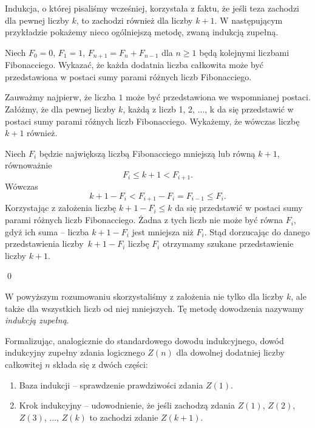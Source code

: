 


\noindent
Indukcja, o której pisaliśmy wcześniej, korzystała z faktu, że jeśli teza zachodzi dla pewnej liczby $k$, to zachodzi również dla liczby $k + 1$. W następującym przykładzie pokażemy nieco ogólniejszą metodę, zwaną indukcją zupełną.

\vspace{10px}


\noindent
Niech $F_0 = 0$, $F_1 = 1$, $F_{n + 1} = F_n + F_{n - 1}$ dla $n \geqslant 1$ będą kolejnymi liczbami Fibonacciego. Wykazać, że każda dodatnia liczba całkowita może być przedstawiona w postaci sumy parami różnych liczb Fibonacciego.

\vspace{10px}


\noindent
Zauważmy najpierw, że liczba $1$ może być przedstawiona we wspomnianej postaci.
Załóżmy, że dla pewnej liczby $k$, każdą z liczb 1, 2, ..., k da się przedstawić w postaci sumy parami różnych liczb Fibonacciego. Wykażemy, że wówczas liczbę $k + 1$ również.

\vspace{10px}

\noindent
Niech $F_i$ będzie największą liczbą Fibonacciego mniejszą lub równą $k + 1$, równoważnie
\[
	F_i \leqslant k + 1 < F_{i + 1}.
\]
Wówczas
\[
	k + 1 - F_i < F_{i + 1} -  F_{i} = F_{i - 1} \leqslant F_{i}.
\]
Korzystając z założenia liczbę $k + 1 - F_i \leqslant k$ da się przedstawić w postaci sumy parami różnych liczb Fibonacciego. Żadna z tych liczb nie może być równa $F_{i}$, gdyż ich suma -- liczba $k + 1 - F_i$ jest mniejsza niż $F_i$. Stąd dorzucając do danego przedstawienia liczby~$k + 1 - F_i$  liczbę $F_{i}$ otrzymamy szukane przedstawienie liczby $k + 1$.

\qed

\noindent



\noindent
W powyższym rozumowaniu skorzystaliśmy z założenia nie tylko dla liczby $k$, ale także dla wszystkich liczb od niej mniejszych. Tę metodę dowodzenia  nazywamy \textit{indukcją zupełną}. 

\vspace{10px}

\noindent
Formalizując, analogicznie do standardowego dowodu indukcyjnego, dowód indukcyjny zupełny zdania logicznego $Z(n)$ dla dowolnej dodatniej liczby całkowitej $n$ składa się z dwóch części:
\begin{enumerate}
	\item Baza indukcji -- sprawdzenie prawdziwości zdania $Z(1)$.
	\item Krok indukcyjny -- udowodnienie, że jeśli zachodzą zdania $Z(1)$, $Z(2)$, $Z(3)$, ..., $Z(k)$ to zachodzi zdanie $Z(k + 1)$.
\end{enumerate}

